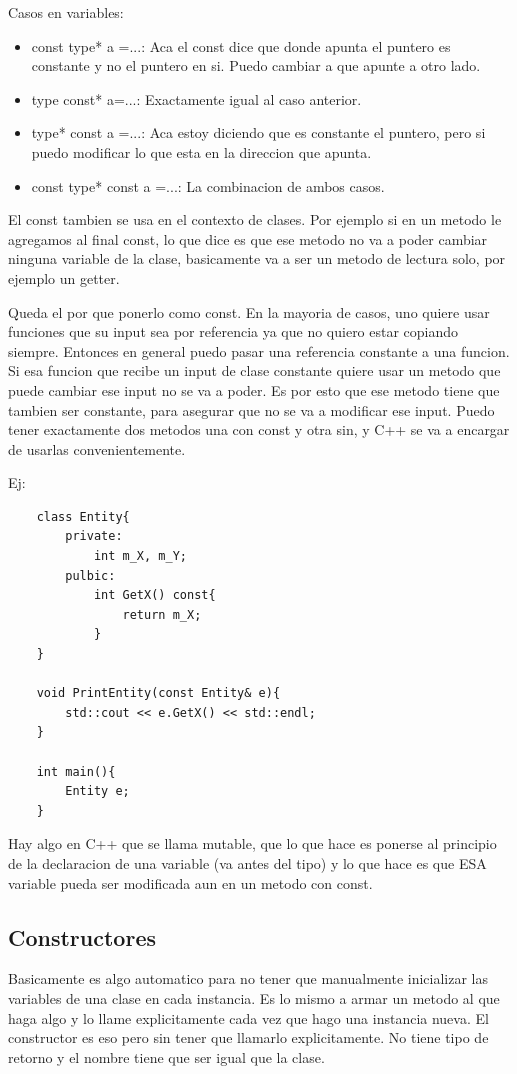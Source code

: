 \documentclass[11pt]{article}
\begin{document}
Casos en variables:
\begin{itemize}
    \item const type* a =...: Aca el const dice que donde apunta el puntero es constante
            y no el puntero en si. Puedo cambiar a que apunte a otro lado.
    \item type const* a=...: Exactamente igual al caso anterior.
    \item type* const a =...: Aca estoy diciendo que es constante el puntero, pero si
        puedo modificar lo que esta en la  direccion que apunta.
    \item const type* const a =...: La combinacion de ambos casos.
\end{itemize}

El const tambien se usa en el contexto de clases.
Por ejemplo si en un metodo le agregamos al final const, lo que dice es que ese
metodo no va a poder cambiar ninguna variable de la clase, basicamente va a ser
un metodo de lectura solo, por ejemplo un getter.

Queda el por que ponerlo como const.
En la mayoria de casos, uno quiere usar funciones que su input sea por referencia
ya que no quiero estar copiando siempre.
Entonces en general puedo pasar una referencia constante a una funcion.
Si esa funcion que recibe un input de clase constante quiere usar un metodo
que puede cambiar ese input no se va a poder.
Es por esto que ese metodo tiene que tambien ser constante, para asegurar
que no se va a modificar ese input.
Puedo tener exactamente dos metodos una con const y otra sin, y C++
se va a encargar de usarlas convenientemente.

Ej:
\begin{lstlisting}
    class Entity{
        private:
            int m_X, m_Y;
        pulbic:
            int GetX() const{
                return m_X;
            }
    }

    void PrintEntity(const Entity& e){
        std::cout << e.GetX() << std::endl;
    }

    int main(){
        Entity e;
    }
\end{lstlisting}

Hay algo en C++ que se llama mutable, que lo que hace es ponerse al principio de
la declaracion de una variable (va antes del tipo) y lo que hace es que ESA variable
pueda ser modificada aun en un metodo con const.

\subsection{Constructores}
Basicamente es algo automatico para no tener que manualmente inicializar las
variables de una clase en cada instancia.
Es lo mismo a armar un metodo al que haga algo y lo llame explicitamente cada
vez que hago una instancia nueva.
El constructor es eso pero sin tener que llamarlo explicitamente.
No tiene tipo de retorno y el nombre tiene que ser igual que la clase.
\end{document}
